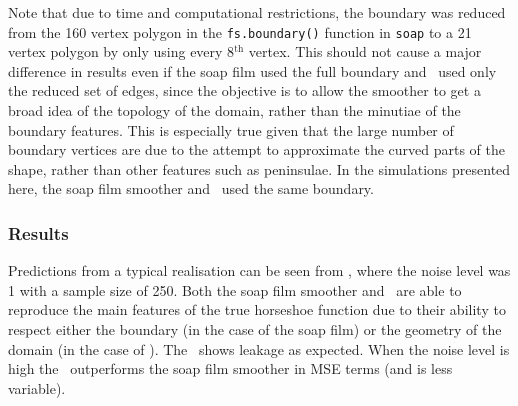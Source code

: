 Note that due to time and computational restrictions, the boundary was reduced from the 160 vertex polygon in the \texttt{fs.boundary()} function in \texttt{soap} to a 21 vertex polygon by only using every 8$^\text{th}$ vertex. This should not cause a major difference in results even if the soap film used the full boundary and \mdsap\ used only the reduced set of edges, since the objective is to allow the smoother to get a broad idea of the topology of the domain, rather than the minutiae of the boundary features. This is especially true given that the large number of boundary vertices are due to the attempt to approximate the curved parts of the shape, rather than other features such as peninsulae. In the simulations presented here, the soap film smoother and \mdsap\ used the same boundary.

\subsubsection{Results}

Predictions from a typical realisation can be seen from , where the noise level was 1 with a sample size of 250. Both the soap film smoother and \mdsap\ are able to reproduce the main features of the true horseshoe function due to their ability to respect either the boundary (in the case of the soap film) or the geometry of the domain (in the case of \mdsap). The \tprs\ shows leakage as expected. When the noise level is high the \mdsap\ outperforms the soap film smoother in MSE terms (and is less variable).


